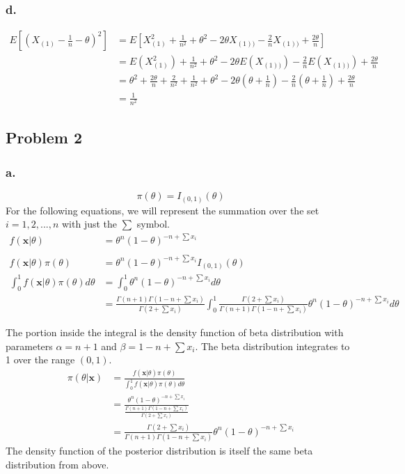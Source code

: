 \documentclass{article}
\begin{document}
\subsubsection*{d.}
\begin{align*}
E\left[(X_{(1)} -\frac{1}{n} - \theta)^2\right] &= E\left[X_{(1)}^2 + \frac{1}{n^2} + \theta^2 - 2\theta X_{(1))} - \frac{2}{n} X_{(1))} + \frac{2\theta}{n}\right] \\
&= E\left(X_{(1)}^2\right) + \frac{1}{n^2} + \theta^2 - 2\theta E(X_{(1))}) - \frac{2}{n} E(X_{(1))}) + \frac{2\theta}{n} \\
&=\theta^2+\frac{2\theta}{n}+\frac{2}{n^2} + \frac{1}{n^2} + \theta^2 - 2\theta\left(\theta + \frac{1}{n}\right) -\frac{2}{n}\left(\theta + \frac{1}{n}\right) + \frac{2\theta}{n} \\
&= \frac{1}{n^2}
\end{align*}


\subsection*{Problem 2}
\subsubsection*{a.}
\[\pi(\theta) = I_{(0,1)}(\theta)\]
For the following equations, we will represent the summation over the set $i = 1, 2, ..., n$ with just the $\sum$ symbol. 
\begin{align*}
f(\mathbf{x}|\theta) &= \theta^n(1-\theta)^{-n+\sum x_i} \\ \\
f(\mathbf{x}|\theta)\pi(\theta) &= \theta^n(1-\theta)^{-n+\sum x_i}I_{(0,1)}(\theta) \\
\int_0^1 f(\mathbf{x}|\theta)\pi(\theta) d\theta &= \int_0^1 \theta^n(1-\theta)^{-n+\sum x_i} d\theta \\
&=\frac{\Gamma(n+1)\Gamma(1-n+\sum x_i)}{\Gamma(2+ \sum x_i)}\int_0^1\frac{\Gamma(2+ \sum x_i)}{\Gamma(n+1)\Gamma(1-n+\sum x_i)}\theta^n(1-\theta)^{-n+\sum x_i} d\theta
\end{align*}
\pagebreak

The portion inside the integral is the density function of beta distribution with parameters $\alpha = n+1$ and $\beta = 1 - n + \sum x_i$. The beta distribution integrates to 1 over the range $(0, 1)$. 
\begin{align*}
\pi(\theta|\mathbf{x}) &= \frac{f(\mathbf{x}|\theta)\pi(\theta)}{\int_0^1 f(\mathbf{x}|\theta)\pi(\theta) d\theta} \\
&=\frac{\theta^n(1-\theta)^{-n+\sum x_i}}{\frac{\Gamma(n+1)\Gamma(1-n+\sum x_i)}{\Gamma(2+ \sum x_i)}} \\
&=\frac{\Gamma(2+ \sum x_i)}{\Gamma(n+1)\Gamma(1-n+\sum x_i)}\theta^n(1-\theta)^{-n+\sum x_i}
\end{align*}
The density function of the posterior distribution is itself the same beta distribution from above. 
\end{document}
